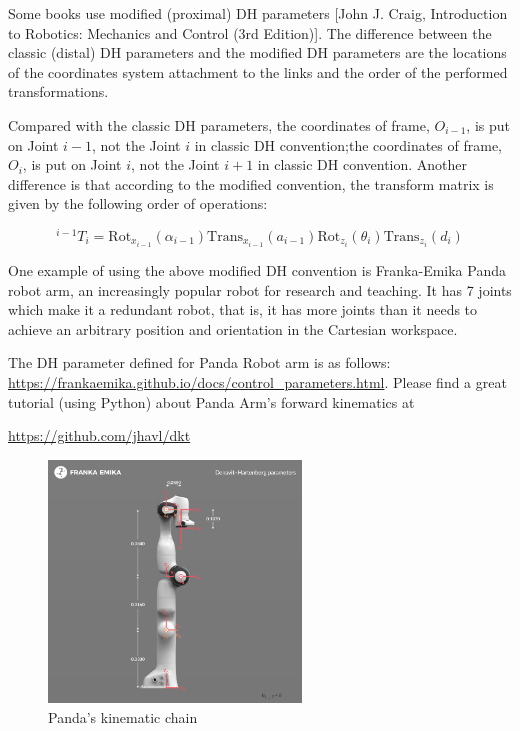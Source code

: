 \documentclass[10pt]{article}
\begin{document}
Some books use modified (proximal) DH parameters [John J. Craig, Introduction to Robotics: Mechanics and Control (3rd Edition)]. The difference between the classic (distal) DH parameters and the modified DH parameters are the locations of the coordinates system attachment to the links and the order of the performed transformations.


Compared with the classic DH parameters, the coordinates of frame, $O_{i-1}$, is put on Joint $i-1$, not the Joint $i$ in classic DH convention;the coordinates of frame, $O_{i}$, is put on Joint $i$, not the Joint $i+1$ in classic DH convention. Another difference is that according to the modified convention, the transform matrix is given by the following order of operations:

$$
^{i-1}T_i=\text{Rot}_{x_{i-1}}(\alpha_{i-1})\text{Trans}_{x_{i-1}}(a_{i-1})\text{Rot}_{z_{i}}(\theta_{i})\text{Trans}_{z_{i}}(d_{i})
$$

One example of using the above modified DH convention is Franka-Emika Panda robot arm, an increasingly popular robot for research and teaching.  It has 7 joints which make it a redundant robot, that is, it has more joints than it needs to achieve an arbitrary position and orientation in the Cartesian workspace. 


The DH parameter defined for Panda Robot arm is as follows: \url{https://frankaemika.github.io/docs/control_parameters.html}. Please find a great  tutorial (using Python) about Panda Arm's forward kinematics at 


\href{https://github.com/jhavl/dkt}{https://github.com/jhavl/dkt}



\begin{figure}[H]
    \centering
    \includegraphics[max width=0.6\textwidth]{kinematics/dh-diagram.png}
    \caption{Panda’s kinematic chain}
\end{figure}
\end{document}
